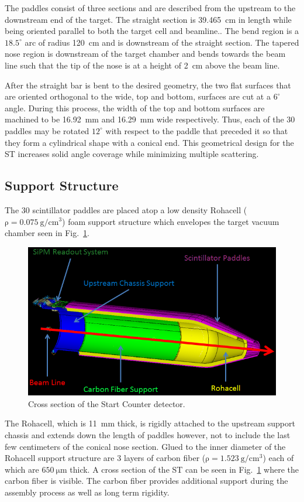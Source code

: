 The paddles consist of three sections and are described from the upstream to the downstream end of the target.  The straight section is 39.465~cm in length while being oriented parallel to both the target cell and beamline..  The bend region is a $18.5^{\circ}$ arc of radius 120~cm and is downstream of the straight section. The tapered nose region is downstream of the target chamber and bends towards the beam line such that the tip of the nose is at a height of 2~cm above the beam line.  

After the straight bar is bent to the desired geometry, the two flat surfaces that are oriented orthogonal to the wide, top and bottom, surfaces are cut at a $6^{\circ}$ angle.  During this process, the width of the top and bottom surfaces are machined to be 16.92~mm and 16.29~mm wide respectively.  Thus, each of the 30 paddles may be rotated $12^{\circ}$ with respect to the paddle that preceded it so that they form a cylindrical shape with a conical end.  This geometrical design for the ST increases solid angle coverage while minimizing multiple scattering.  

\subsection{Support Structure}

The 30 scintillator paddles are placed atop a low density Rohacell ($\mathrm{\rho = 0.075\ g/cm^{3}}$) foam support structure which envelopes the target vacuum chamber seen in Fig.~\ref{fig:ST_Cross_Section}.  
\begin{figure}[!htb]
	\centering
	\includegraphics[width=1.0\columnwidth]{design/figs/ST_Cross_Section}
	\caption[Cross section of the Start Counter detector]{Cross section of the Start Counter detector.}
	\label{fig:ST_Cross_Section}
\end{figure}
The Rohacell, which is 11~mm thick, is rigidly attached to the upstream support chassis and extends down the length of paddles however, not to include the last few centimeters of the conical nose section.  Glued to the inner diameter of the Rohacell support structure are 3 layers of carbon fiber ($\mathrm{\rho = 1.523\ g/cm^{3}}$) each of which are $\mathrm{650\ \mu m}$ thick.  A cross section of the ST can be seen in Fig.~\ref{fig:ST_Cross_Section} where the carbon fiber is visible.  The carbon fiber provides additional support during the assembly process as well as long term rigidity.  

